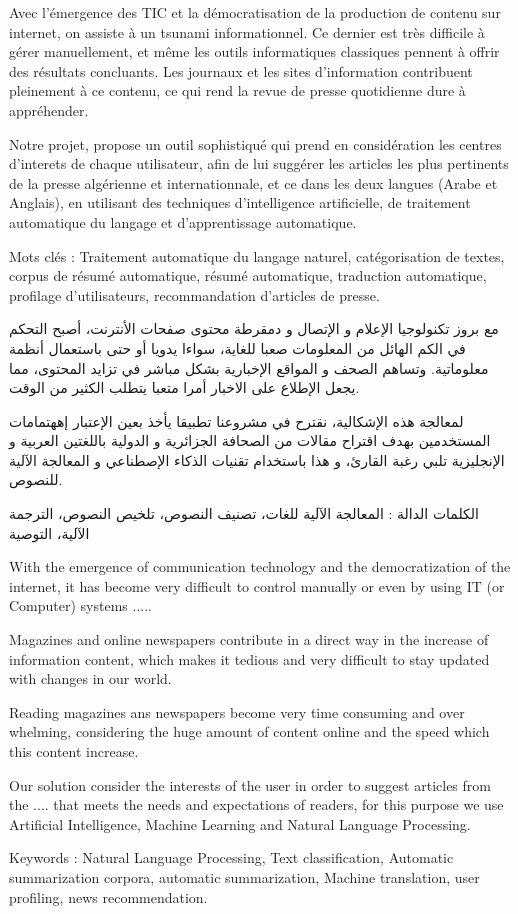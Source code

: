 
\newpage
Avec l'émergence des TIC et la démocratisation de la production de contenu sur internet, on assiste à un tsunami informationnel. Ce dernier est très difficile à gérer manuellement, et même les outils informatiques classiques pennent à offrir des résultats concluants. Les journaux et les sites d'information contribuent pleinement à ce contenu, ce qui rend la revue de presse quotidienne dure à appréhender. 

Notre projet, propose un outil sophistiqué qui prend en considération les centres d'interets de chaque utilisateur, afin de lui suggérer les articles les plus pertinents de la presse algérienne et internationnale, et ce dans les deux langues (Arabe et Anglais), en utilisant des techniques d'intelligence artificielle, de traitement automatique du langage et d'apprentissage automatique. 

Mots clés : Traitement automatique du langage naturel, catégorisation de textes, corpus de résumé
automatique, résumé automatique, traduction automatique, profilage d'utilisateurs, recommandation d'articles de presse.  

\begin{arab}
مع بروز تكنولوجيا الإعلام و الإتصال و دمقرطة محتوى صفحات الأنترنت، أصبح التحكم في الكم الهائل من المعلومات صعبا للغاية، سواءا يدويا أو حتى باستعمال أنظمة معلوماتية. وتساهم الصحف و المواقع الإخبارية بشكل مباشر في تزايد المحتوى، مما يجعل الإطلاع على الاخبار أمرا متعبا يتطلب الكثير من الوقت. 

لمعالجة هذه الإشكالية، نقترح في مشروعنا تطبيقا يأخذ بعين الإعتبار إههتمامات المستخدمين بهدف اقتراح مقالات من الصحافة الجزائرية و الدولية باللغتين العربية و الإنجليزية تلبي رغبة القارئ، و هذا باستخدام تقنيات الذكاء الإصطناعي و المعالجة الآلية للنصوص.

الكلمات الدالة : المعالجة الآلية للغات،  تصنيف النصوص، تلخيص النصوص، الترجمة الآلية، التوصية   
\end{arab}


With the emergence of communication technology and the democratization of the internet, it has become very difficult to control manually or even by using IT (or Computer) systems .....

Magazines and online newspapers contribute in a direct way in the increase of information content, which makes it tedious and very difficult to stay updated with changes in our world.

Reading magazines ans newspapers become very time consuming and over whelming, considering the huge amount of content online and the speed which this content increase.

Our solution consider the interests of the user in order to suggest articles from the  ....
that meets the needs and expectations of readers, for this purpose we use Artificial Intelligence, Machine Learning and Natural Language Processing.

Keywords : Natural Language Processing, Text classification, Automatic summarization corpora, automatic summarization, Machine translation, user profiling, news recommendation. 